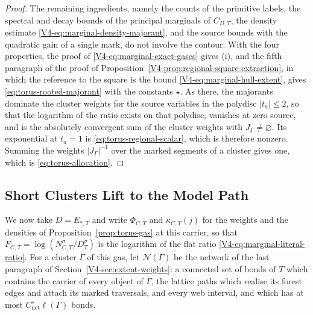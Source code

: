 \documentclass[11pt]{article}
\numberwithin{equation}{section}
\theoremstyle{remark}
\theoremstyle{plain}
\begin{document}
\begin{proof}
The remaining ingredients, namely the counts of the primitive labels, the spectral and decay bounds of the principal marginals of $C_{D,T}$, the density estimate \eqref{V4-eq:marginal-density-majorant}, and the source bounds with the quadratic gain of a single mark, do not involve the contour. With the four properties, the proof of \eqref{V4-eq:marginal-exact-gases} gives (i), and the fifth paragraph of the proof of Proposition~\ref{V4-prop:regional-square-extraction}, in which the reference to the square is the bound \eqref{V4-eq:marginal-hull-extent}, gives \eqref{eq:torus-rooted-majorant} with the constants $\star$. As there, the majorants dominate the cluster weights for the source variables in the polydisc $| t_a|\leqslant 2$, so that the logarithm of the ratio exists on that polydisc, vanishes at zero source, and is the absolutely convergent sum of the cluster weights with $J_{\Gamma}\neq\varnothing$. Its exponential at $t_a=1$ is \eqref{eq:torus-regional-scalar}, which is therefore nonzero. Summing the weights $| J_{\Gamma}|^{-1}$ over the marked segments of a cluster gives one, which is \eqref{eq:torus-allocation}.
\end{proof}

\subsection{Short Clusters Lift to the Model Path}\label{sec:torus-lift}

We now take $D= E_{*,T}$ and write $\Phi_{C,T}$ and $\kappa_{C,T}(j)$ for the weights and the densities of Proposition~\ref{prop:torus-gas} at this carrier, so that $F_{C,T}=\log(N^{\sigma}_{C,T}/D^{\sigma}_T)$ is the logarithm of the flat ratio \eqref{V4-eq:marginal-literal-ratio}. For a cluster $\Gamma$ of this gas, let $\mathscr N(\Gamma)$ be the network of the last paragraph of Section~\ref{V4-sec:extent-weights}: a connected set of bonds of $T$ which contains the carrier of every object of $\Gamma$, the lattice paths which realise its forest edges and attach its marked traversals, and every web interval, and which has at most $C_{\mathrm{net}}^{\star}\ell(\Gamma)$ bonds.
\end{document}
